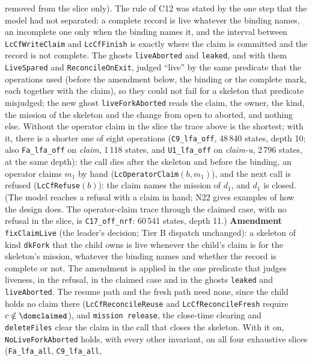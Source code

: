 \documentclass[a4paper,10pt,fleqn]{article}
\newcommand{\field}[1]{\texttt{#1}}
\begin{document}
\begin{enumerate}
    removed from the slice only). The rule of C12 was stated by the one step
    that the model had not separated: a complete record is live whatever the
    binding names, an incomplete one only when the binding names it, and the
    interval between \field{LcCfWriteClaim} and \field{LcCfFinish} is exactly
    where the claim is committed and the record is not complete. The ghosts
    \field{liveAborted} and \field{leaked}, and with them \field{LiveSpared}
    and \field{ReconcileOnExit}, judged ``live'' by the same predicate that
    the operations used (before the amendment below, the binding or the
    complete mark, each together with the claim), so they could not fail for a
    skeleton that predicate misjudged; the new ghost
    \field{liveForkAborted} reads the claim, the owner, the kind, the mission
    of the skeleton and the change from open to aborted, and nothing else. Without the operator claim in the slice the trace above is
    the shortest; with it, there is a shorter one of eight operations
    (\texttt{C9\_lfa\_off}, 48\,840 states, depth 10; also \texttt{Fa\_lfa\_off} on
    \emph{claim}, 1\,118 states, and \texttt{U1\_lfa\_off} on \emph{claim-u},
    2\,796 states, at the same depth): the call dies after the skeleton and before
    the binding, an operator claims $m_1$ by hand (\field{LcOperatorClaim}$(b,m_1)$),
    and the next call is refused (\field{LcCfRefuse}$(b)$): the claim names the
    mission of $d_1$, and $d_1$ is closed. (The model reaches a refusal with a claim in hand;
    N22 gives examples of how the design does. The operator-claim trace through the claimed
    case, with no refusal in the slice, is \texttt{C17\_off\_nrf}: 60\,541
    states, depth 11.) \textbf{Amendment}
    \field{fixClaimLive} (the leader's decision; Tier B dispatch unchanged): a
    skeleton of kind \field{dkFork} that the child owns is live whenever the
    child's claim is for the skeleton's mission, whatever the binding names and
    whether the record is complete or not. The amendment is applied in the one
    predicate that judges liveness, in the refusal, in the claimed case and in
    the ghosts \field{leaked} and \field{liveAborted}. The resume path and the
    fresh path need none, since the child holds no claim there
    (\field{LcCfReconcileReuse} and \field{LcCfReconcileFresh} require
    $c\notin\dom\field{claimed}$), and \field{mission release}, the
    close-time clearing and \field{deleteFiles} clear the claim in the call
    that closes the skeleton. With it on, \field{NoLiveForkAborted} holds, with every other
    invariant, on all four exhaustive slices (\texttt{Fa\_lfa\_all}, \texttt{C9\_lfa\_all},

\end{enumerate}
\end{document}
